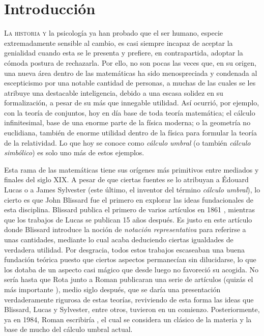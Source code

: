 \chapter*{Introducción}

\lettrine{L}{a historia y} la psicología ya han probado que el ser humano, especie extremadamente sensible al cambio, es casi siempre incapaz de aceptar la genialidad cuando esta se le presenta y prefiere, en contrapartida, adoptar la cómoda postura de rechazarla. Por ello, no son pocas las veces que, en su origen, una nueva área dentro de las matemáticas ha sido menospreciada y condenada al escepticismo por una notable cantidad de personas, a muchas de las cuales se les atribuye una destacable inteligencia, debido a una escasa solidez en su formalización, a pesar de su más que innegable utilidad. Así ocurrió, por ejemplo, con la teoría de conjuntos, hoy en día base de toda teoría matemática; el cálculo infinitesimal, base de una enorme parte de la física moderna; o la geometría no euclidiana, también de enorme utilidad dentro de la física para formular la teoría de la relatividad. Lo que hoy se conoce como \textit{cálculo umbral} (o también \textit{cálculo simbólico}) es solo uno más de estos ejemplos.

Esta rama de las matemáticas tiene sus orígenes más primitivos entre mediados y finales del siglo XIX. A pesar de que ciertas fuentes se lo atribuyan a Édouard Lucas o a James Sylvester (este último, el inventor del término \textit{cálculo umbral}), lo cierto es que John Blissard fue el primero en explorar las ideas fundacionales de esta disciplina. Blissard publica el primero de varios artículos en 1861 \cite{blissard}, mientras que los trabajos de Lucas se publican 15 años después. Es justo en este artículo donde Blissard introduce la noción de \textit{notación representativa} para referirse a unas cantidades, mediante lo cual acaba deduciendo ciertas igualdades de verdadera utilidad. Por desgracia, todos estos trabajos escaseaban una buena fundación teórica puesto que ciertos aspectos permanecían sin dilucidarse, lo que los dotaba de un aspecto casi mágico que desde luego no favoreció su acogida. No sería hasta que Rota junto a Roman publicaran una serie de artículos (quizás el más importante \cite{roman2}), medio siglo después, que se daría una presentación verdaderamente rigurosa de estas teorías, reviviendo de esta forma las ideas que Blissard, Lucas y Sylvester, entre otros, tuvieron en un comienzo. Posteriormente, ya en 1984, Roman escribiría \cite{roman1}, el cual se considera un clásico de la materia y la base de mucho del cálculo umbral actual.

